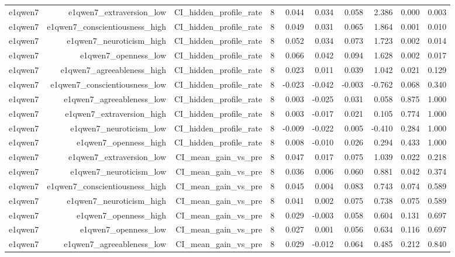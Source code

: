 \documentclass[11pt]{article}
\begin{document}
\begin{landscape}
\begin{longtable}{@{}lrrrrrrrrr@{}}
e1qwen7 & e1qwen7\_extraversion\_low & CI\_hidden\_profile\_rate & 8 & 0.044 & 0.034 & 0.058 & 2.386 & 0.000 & 0.003 \\
e1qwen7 & e1qwen7\_conscientiousness\_high & CI\_hidden\_profile\_rate & 8 & 0.049 & 0.031 & 0.065 & 1.864 & 0.001 & 0.010 \\
e1qwen7 & e1qwen7\_neuroticism\_high & CI\_hidden\_profile\_rate & 8 & 0.052 & 0.034 & 0.073 & 1.723 & 0.002 & 0.014 \\
e1qwen7 & e1qwen7\_openness\_low & CI\_hidden\_profile\_rate & 8 & 0.066 & 0.042 & 0.094 & 1.628 & 0.002 & 0.017 \\
e1qwen7 & e1qwen7\_agreeableness\_high & CI\_hidden\_profile\_rate & 8 & 0.023 & 0.011 & 0.039 & 1.042 & 0.021 & 0.129 \\
e1qwen7 & e1qwen7\_conscientiousness\_low & CI\_hidden\_profile\_rate & 8 & -0.023 & -0.042 & -0.003 & -0.762 & 0.068 & 0.340 \\
e1qwen7 & e1qwen7\_agreeableness\_low & CI\_hidden\_profile\_rate & 8 & 0.003 & -0.025 & 0.031 & 0.058 & 0.875 & 1.000 \\
e1qwen7 & e1qwen7\_extraversion\_high & CI\_hidden\_profile\_rate & 8 & 0.003 & -0.017 & 0.021 & 0.105 & 0.774 & 1.000 \\
e1qwen7 & e1qwen7\_neuroticism\_low & CI\_hidden\_profile\_rate & 8 & -0.009 & -0.022 & 0.005 & -0.410 & 0.284 & 1.000 \\
e1qwen7 & e1qwen7\_openness\_high & CI\_hidden\_profile\_rate & 8 & 0.008 & -0.010 & 0.026 & 0.294 & 0.433 & 1.000 \\
e1qwen7 & e1qwen7\_extraversion\_low & CI\_mean\_gain\_vs\_pre & 8 & 0.047 & 0.017 & 0.075 & 1.039 & 0.022 & 0.218 \\
e1qwen7 & e1qwen7\_neuroticism\_low & CI\_mean\_gain\_vs\_pre & 8 & 0.036 & 0.006 & 0.060 & 0.881 & 0.042 & 0.374 \\
e1qwen7 & e1qwen7\_conscientiousness\_high & CI\_mean\_gain\_vs\_pre & 8 & 0.045 & 0.004 & 0.083 & 0.743 & 0.074 & 0.589 \\
e1qwen7 & e1qwen7\_neuroticism\_high & CI\_mean\_gain\_vs\_pre & 8 & 0.041 & 0.002 & 0.075 & 0.738 & 0.075 & 0.589 \\
e1qwen7 & e1qwen7\_openness\_high & CI\_mean\_gain\_vs\_pre & 8 & 0.029 & -0.003 & 0.058 & 0.604 & 0.131 & 0.697 \\
e1qwen7 & e1qwen7\_openness\_low & CI\_mean\_gain\_vs\_pre & 8 & 0.027 & 0.001 & 0.056 & 0.634 & 0.116 & 0.697 \\
e1qwen7 & e1qwen7\_agreeableness\_low & CI\_mean\_gain\_vs\_pre & 8 & 0.029 & -0.012 & 0.064 & 0.485 & 0.212 & 0.840 \\

\end{longtable}
\end{landscape}
\end{document}
